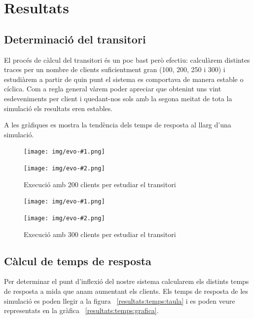 \section{Resultats}

\subsection{Determinació del transitori}

El procés de càlcul del transitori és un poc bast però efectiu: calculàrem
distintes traces per un nombre de clients suficientment gran (100, 200, 250 i
300) i estudiàrem a partir de quin punt el sistema es comportava de manera
estable o cíclica. Com a regla general vàrem poder apreciar que obtenint uns
vint esdeveniments per client i quedant-nos sols amb la segona meitat de tota
la simulació els resultats eren estables.

A les gràfiques es mostra la tendència dels temps de resposta al llarg d'una
simulació.

\newcommand{\grafictransitori}[2]{
\begin{figure}[t]
  \centering
  \texttt{[image: img/evo-\#1.png]}
  \caption{Execució amb #1 clients per estudiar el transitori}
  \texttt{[image: img/evo-\#2.png]}
  \caption{Execució amb #2 clients per estudiar el transitori}
\end{figure}
}

\grafictransitori{100}{200}
\grafictransitori{250}{300}

\subsection{Càlcul de temps de resposta}

Per determinar el punt d'inflexió del nostre sistema calcularem els distints
temps de resposta a mida que anam aumentant els clients. Els temps de resposta
de les simulació es poden llegir a la figura ~\ref{resultats:temps:taula} i es
poden veure representats en la gràfica ~\ref{resultats:temps:grafica}.




